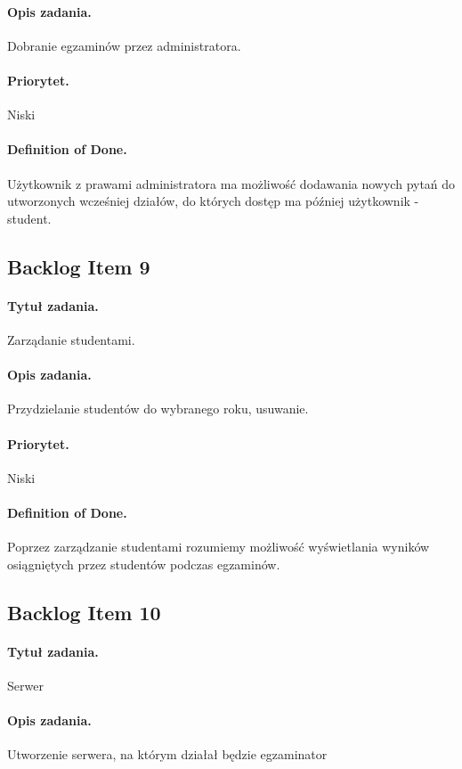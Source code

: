 \documentclass[a4paper]{article}
\begin{document}
\paragraph{Opis zadania.} Dobranie egzaminów przez administratora.
\paragraph{Priorytet.} Niski
\paragraph{Definition of Done.} Użytkownik z prawami administratora ma możliwość dodawania nowych pytań do utworzonych wcześniej działów, do których dostęp ma później użytkownik - student.

\subsection{Backlog Item 9}
\paragraph{Tytuł zadania.} Zarządanie studentami.
\paragraph{Opis zadania.} Przydzielanie studentów do wybranego roku, usuwanie.
\paragraph{Priorytet.} Niski
\paragraph{Definition of Done.} Poprzez zarządzanie studentami rozumiemy możliwość wyświetlania wyników osiągniętych przez studentów podczas egzaminów.

\subsection{Backlog Item 10}
\paragraph{Tytuł zadania.} Serwer
\paragraph{Opis zadania.} Utworzenie serwera, na którym działał będzie egzaminator
\end{document}
